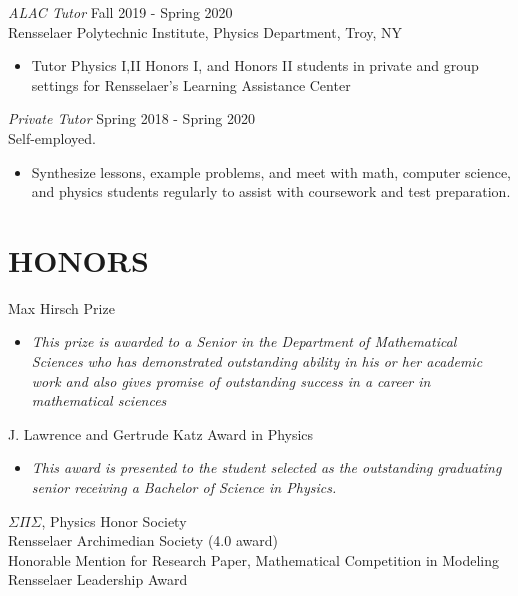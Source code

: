 \documentclass[margin]{rpires}
\begin{document}
\begin{resume}
    {\sl ALAC Tutor} \hfill Fall 2019 - Spring 2020 \\
    Rensselaer Polytechnic Institute, Physics Department, Troy, NY
    \begin{itemize}  \itemsep -2pt %
        \item Tutor Physics I,II Honors I, and Honors II students in private and group settings for Rensselaer's Learning Assistance Center
    \end{itemize}

    {\sl Private Tutor} \hfill Spring 2018 - Spring 2020 \\
    Self-employed.
    \begin{itemize}  \itemsep -2pt %
        \item Synthesize lessons, example problems, and meet with math, computer science, and physics students regularly to assist with coursework and test preparation.
    \end{itemize}
    
    
\section{HONORS} Max Hirsch Prize
                \begin{itemize}
                    \item[] {\sl This prize is awarded to a Senior in the Department of Mathematical Sciences who has demonstrated outstanding ability in his or her academic work and also gives promise of outstanding success in a career in mathematical sciences}
                \end{itemize}
                \vspace{-0.4cm}
                J. Lawrence and Gertrude Katz Award in Physics
                \begin{itemize} 
                    \item[] {\sl This award is presented to the student selected as the outstanding graduating senior receiving a Bachelor of Science in Physics.}
                \end{itemize}
                \vspace{-0.4cm}
                $\Sigma \Pi \Sigma$, Physics Honor Society \\
                Rensselaer Archimedian Society (4.0 award) \\
                Honorable Mention for Research Paper,       Mathematical Competition in Modeling \\
                Rensselaer Leadership Award 
 

\end{resume}
\end{document}
